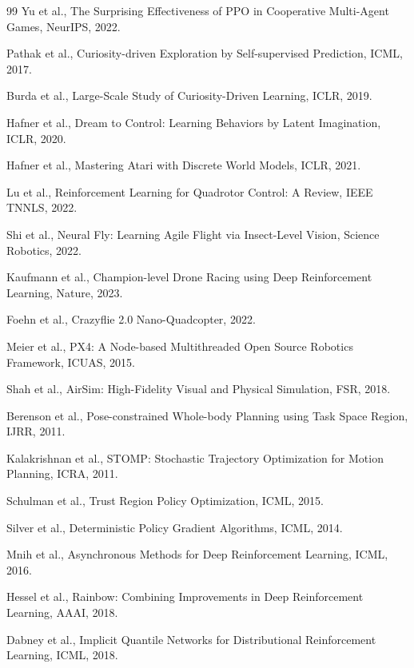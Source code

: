 \documentclass[12pt,a4paper]{ctexart}
\begin{document}
\begin{thebibliography}{99}
 Yu et al., The Surprising Effectiveness of PPO in Cooperative Multi-Agent Games, NeurIPS, 2022.

 Pathak et al., Curiosity-driven Exploration by Self-supervised Prediction, ICML, 2017.

 Burda et al., Large-Scale Study of Curiosity-Driven Learning, ICLR, 2019.

 Hafner et al., Dream to Control: Learning Behaviors by Latent Imagination, ICLR, 2020.

 Hafner et al., Mastering Atari with Discrete World Models, ICLR, 2021.

 Lu et al., Reinforcement Learning for Quadrotor Control: A Review, IEEE TNNLS, 2022.

 Shi et al., Neural Fly: Learning Agile Flight via Insect-Level Vision, Science Robotics, 2022.

 Kaufmann et al., Champion-level Drone Racing using Deep Reinforcement Learning, Nature, 2023.

 Foehn et al., Crazyflie 2.0 Nano-Quadcopter, 2022.

 Meier et al., PX4: A Node-based Multithreaded Open Source Robotics Framework, ICUAS, 2015.

 Shah et al., AirSim: High-Fidelity Visual and Physical Simulation, FSR, 2018.

 Berenson et al., Pose-constrained Whole-body Planning using Task Space Region, IJRR, 2011.

 Kalakrishnan et al., STOMP: Stochastic Trajectory Optimization for Motion Planning, ICRA, 2011.

 Schulman et al., Trust Region Policy Optimization, ICML, 2015.

 Silver et al., Deterministic Policy Gradient Algorithms, ICML, 2014.

 Mnih et al., Asynchronous Methods for Deep Reinforcement Learning, ICML, 2016.

 Hessel et al., Rainbow: Combining Improvements in Deep Reinforcement Learning, AAAI, 2018.

 Dabney et al., Implicit Quantile Networks for Distributional Reinforcement Learning, ICML, 2018.


\end{thebibliography}
\end{document}
